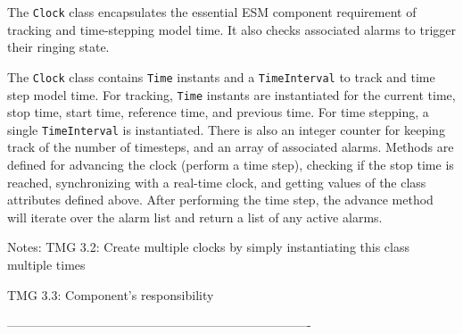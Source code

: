    The {\tt Clock} class encapsulates the essential ESM component requirement
   of tracking and time-stepping model time.  It also checks associated alarms
   to trigger their ringing state.
  
   The {\tt Clock} class contains {\tt Time} instants and a {\tt TimeInterval}
   to track and time step model time.  For tracking, {\tt Time} instants are
   instantiated for the current time, stop time, start time, reference time,
   and previous time.  For time stepping, a single {\tt TimeInterval} is
   instantiated.  There is also an integer counter for keeping track of the
   number of timesteps, and an array of associated alarms.  Methods are
   defined for advancing the clock (perform a time step), checking if the
   stop time is reached, synchronizing with a real-time clock, and getting
   values of the class attributes defined above. After performing the time
   step, the advance method will iterate over the alarm list and return a
   list of any active alarms.
  
   Notes:
      TMG 3.2:  Create multiple clocks by simply instantiating this class
                multiple times
  
      TMG 3.3:  Component's responsibility
  
  -------------------------------------------------------------------------
  
